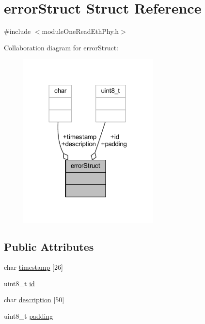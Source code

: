 \hypertarget{structerror_struct}{}\section{error\+Struct Struct Reference}
\label{structerror_struct}


{\ttfamily \#include $<$module\+One\+Read\+Eth\+Phy.\+h$>$}



Collaboration diagram for error\+Struct\+:
\nopagebreak
\begin{figure}[H]
\begin{center}
\leavevmode
\includegraphics[width=201pt]{structerror_struct__coll__graph}
\end{center}
\end{figure}
\subsection*{Public Attributes}
\begin{DoxyCompactItemize}
\item 
char \mbox{\hyperlink{structerror_struct_a51e5ae4be96680737622f257e2eb2479}{timestamp}} \mbox{[}26\mbox{]}
\item 
uint8\+\_\+t \mbox{\hyperlink{structerror_struct_af07d527b0695dad43376f6658ca6d9d3}{id}}
\item 
char \mbox{\hyperlink{structerror_struct_aed437236613db32b2b56361e2cbf3ce6}{description}} \mbox{[}50\mbox{]}
\item 
uint8\+\_\+t \mbox{\hyperlink{structerror_struct_a14bf4c23e01145e362768dfdc4466737}{padding}}
\end{DoxyCompactItemize}


